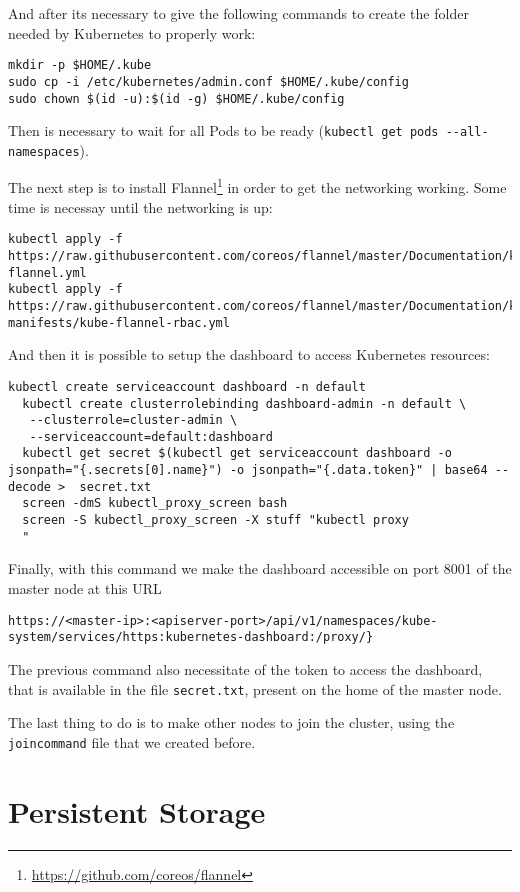 And after its necessary to give the following commands to create the folder 
needed by Kubernetes to properly work:
\begin{lstlisting}
mkdir -p $HOME/.kube
sudo cp -i /etc/kubernetes/admin.conf $HOME/.kube/config
sudo chown $(id -u):$(id -g) $HOME/.kube/config
\end{lstlisting}

Then is necessary to wait for all Pods to be ready
(\texttt{kubectl\ get\ pods\ -\/-all-namespaces}).

The next step is to install 
Flannel\footnote{\url{https://github.com/coreos/flannel}}
in order to get the networking working. Some time is necessay until the 
networking is up:
\begin{lstlisting}
kubectl apply -f https://raw.githubusercontent.com/coreos/flannel/master/Documentation/kube-flannel.yml
kubectl apply -f https://raw.githubusercontent.com/coreos/flannel/master/Documentation/k8s-manifests/kube-flannel-rbac.yml
\end{lstlisting}

And then it is possible to setup the dashboard to access Kubernetes resources:
\begin{lstlisting}
kubectl create serviceaccount dashboard -n default
  kubectl create clusterrolebinding dashboard-admin -n default \
   --clusterrole=cluster-admin \
   --serviceaccount=default:dashboard
  kubectl get secret $(kubectl get serviceaccount dashboard -o jsonpath="{.secrets[0].name}") -o jsonpath="{.data.token}" | base64 --decode >  secret.txt
  screen -dmS kubectl_proxy_screen bash
  screen -S kubectl_proxy_screen -X stuff "kubectl proxy
  "
\end{lstlisting}

Finally, with this command we make the dashboard accessible on port 8001 of the 
master node at this URL
\begin{verbatim}
https://<master-ip>:<apiserver-port>/api/v1/namespaces/kube-system/services/https:kubernetes-dashboard:/proxy/}
\end{verbatim}

The previous command also necessitate of the token to access the dashboard, 
that is available in the file \texttt{secret.txt}, present on the home of the 
master node.

The last thing to do is to make other nodes to join the cluster, using the
\texttt{joincommand} file that we created before.

\section{Persistent Storage}
\label{persistent-storage}

